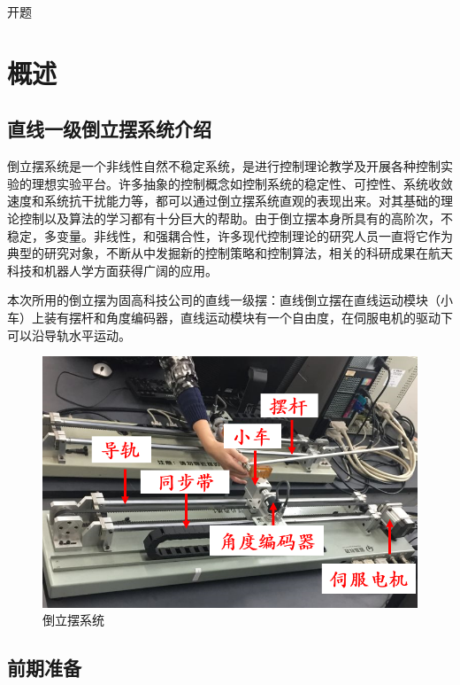 \documentclass{MathorCupmodeling}
\begin{document}
\begin{center}
{\Large 开题}

\end{center}
    \newpage


	\section{概述}

\subsection{直线一级倒立摆系统介绍}

倒立摆系统是一个非线性自然不稳定系统，是进行控制理论教学及开展各种控制实验的理想实验平台。许多抽象的控制概念如控制系统的稳定性、可控性、系统收敛速度和系统抗干扰能力等，都可以通过倒立摆系统直观的表现出来。对其基础的理论控制以及算法的学习都有十分巨大的帮助。由于倒立摆本身所具有的高阶次，不稳定，多变量。非线性，和强耦合性，许多现代控制理论的研究人员一直将它作为典型的研究对象，不断从中发掘新的控制策略和控制算法，相关的科研成果在航天科技和机器人学方面获得广阔的应用。

本次所用的倒立摆为固高科技公司的直线一级摆：直线倒立摆在直线运动模块（小车）上装有摆杆和角度编码器，直线运动模块有一个自由度，在伺服电机的驱动下可以沿导轨水平运动。

\begin{figure}[hbpt]
\centering
\includegraphics[width=12cm]{实物.png}
\caption{倒立摆系统}\label{实物}
\end{figure}


\subsection{前期准备}
\end{document}
